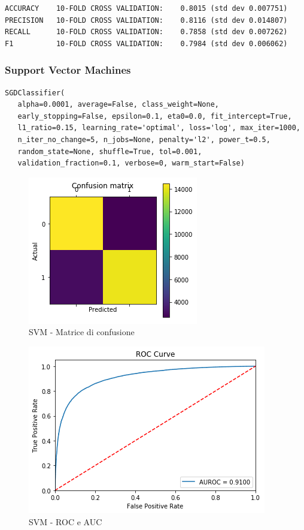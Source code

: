\documentclass[hidelinks, 12pt]{article}
\begin{document}
\begin{verbatim}
ACCURACY    10-FOLD CROSS VALIDATION:    0.8015 (std dev 0.007751)
PRECISION   10-FOLD CROSS VALIDATION:    0.8116 (std dev 0.014807)
RECALL      10-FOLD CROSS VALIDATION:    0.7858 (std dev 0.007262)
F1          10-FOLD CROSS VALIDATION:    0.7984 (std dev 0.006062)
\end{verbatim}

\clearpage

\subsubsection{Support Vector Machines}

\begin{verbatim}
SGDClassifier(
   alpha=0.0001, average=False, class_weight=None,
   early_stopping=False, epsilon=0.1, eta0=0.0, fit_intercept=True,
   l1_ratio=0.15, learning_rate='optimal', loss='log', max_iter=1000,
   n_iter_no_change=5, n_jobs=None, penalty='l2', power_t=0.5,
   random_state=None, shuffle=True, tol=0.001,
   validation_fraction=0.1, verbose=0, warm_start=False)
\end{verbatim}

\begin{figure}[H]
	\centering
	\includegraphics[scale=0.6]{images/05_02_svm_confmat.png}
	\caption[SVM - Matrice di confusione]{SVM - Matrice di confusione}
	\label{fig:svm-cm}
\end{figure}

\begin{figure}[H]
	\centering
	\includegraphics[scale=0.6]{images/05_02_svm_auroc.png}
	\caption[SVM - ROC e AUC]{SVM - ROC e AUC}
	\label{fig:svm-auroc}
\end{figure}
\end{document}
